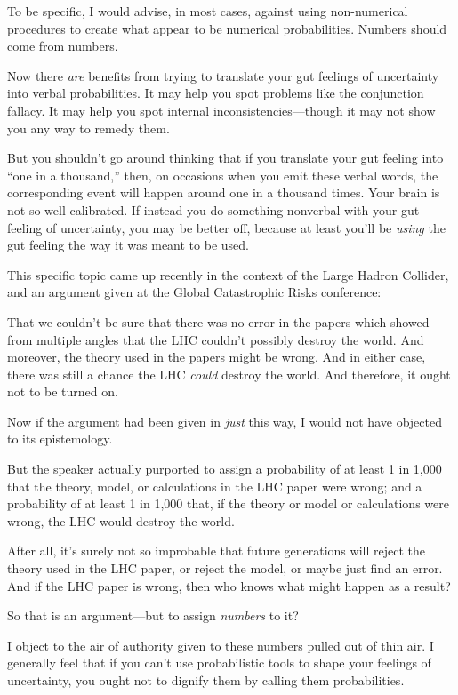 {
 To be specific, I would advise, in most cases, against using
non-numerical procedures to create what appear to be numerical
probabilities. Numbers should come from numbers.}

{
 Now there \textit{are} benefits from trying to translate your gut
feelings of uncertainty into verbal probabilities. It may help you spot
problems like the conjunction fallacy. It may help you spot internal
inconsistencies---though it may not show you any way to remedy them.}

{
 But you shouldn't go around thinking that if you
translate your gut feeling into ``one in a
thousand,'' then, on occasions when you emit these
verbal words, the corresponding event will happen around one in a
thousand times. Your brain is not so well-calibrated. If instead you do
something nonverbal with your gut feeling of uncertainty, you may be
better off, because at least you'll be \textit{using}
the gut feeling the way it was meant to be used.}

{
 This specific topic came up recently in the context of the Large
Hadron Collider, and an argument given at the Global Catastrophic Risks
conference:}

{
 That we couldn't be sure that there was no error
in the papers which showed from multiple angles that the LHC
couldn't possibly destroy the world. And moreover, the
theory used in the papers might be wrong. And in either case, there was
still a chance the LHC \textit{could} destroy the world. And therefore,
it ought not to be turned on.}

{
 Now if the argument had been given in \textit{just} this way, I
would not have objected to its epistemology.}

{
 But the speaker actually purported to assign a probability of at
least 1 in 1,000 that the theory, model, or calculations in the LHC
paper were wrong; and a probability of at least 1 in 1,000 that, if the
theory or model or calculations were wrong, the LHC would destroy the
world.}

{
 After all, it's surely not so improbable that
future generations will reject the theory used in the LHC paper, or
reject the model, or maybe just find an error. And if the LHC paper is
wrong, then who knows what might happen as a result?}

{
 So that is an argument---but to assign \textit{numbers} to it?}

{
 I object to the air of authority given to these numbers pulled out
of thin air. I generally feel that if you can't use
probabilistic tools to shape your feelings of uncertainty, you ought
not to dignify them by calling them probabilities.}

